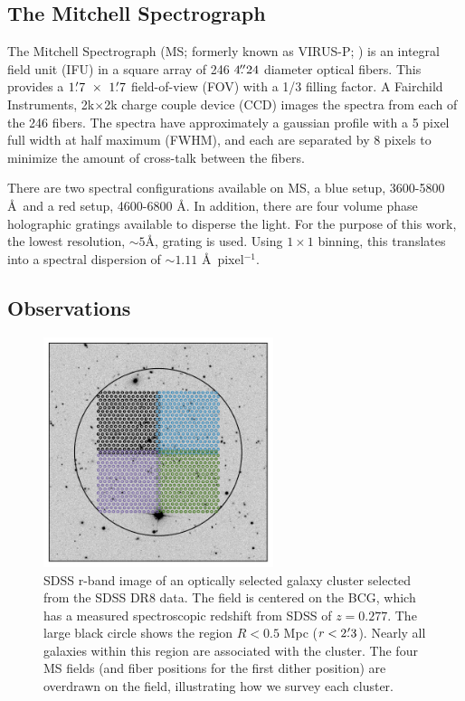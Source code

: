 \subsection{The Mitchell Spectrograph} 
The Mitchell Spectrograph (MS; formerly known as VIRUS-P; \citealt{Hill2008a}) is an integral field unit (IFU) in a square array of 246 $4\mbox{\ensuremath{.\!\!^{\prime\prime}}}24$ diameter optical fibers. This provides a $1\mbox{\ensuremath{.\mkern-4mu^\prime}}7~\times~1\mbox{\ensuremath{.\mkern-4mu^\prime}}7$ field-of-view (FOV) with a 1/3 filling factor. A Fairchild Instruments, 2k$\times$2k charge couple device (CCD) images the spectra from each of the 246 fibers. The spectra have approximately a gaussian profile with a 5 pixel full width at half maximum (FWHM), and each are separated by 8 pixels to minimize the amount of cross-talk between the fibers. 

There are two spectral configurations available on MS, a blue setup, 3600-5800 \AA\ and a red setup, 4600-6800 \AA. In addition, there are four volume phase holographic gratings available to disperse the light. For the purpose of this work, the lowest resolution, $\sim5$\AA, grating is used. Using $1\times1$ binning, this translates into a spectral dispersion of $\sim1.11$ \AA\ pixel$^{-1}$. 

\subsection{Observations} 
\begin{figure}[t]
	\includegraphics[width=0.6\textwidth]{./figures2/pointing.pdf} 
	\caption{SDSS r-band image of an optically selected galaxy cluster selected from the SDSS DR8 data. The field is centered on the BCG, which has a measured spectroscopic redshift from SDSS of $z = 0.277$. The large black circle shows the region $R<0.5$ Mpc ($r<2\mbox{\ensuremath{.\mkern-4mu^\prime}}3$). Nearly all galaxies within this region are associated with the cluster. The four MS fields (and fiber positions for the first dither position) are overdrawn on the field, illustrating how we survey each cluster.} \label{2fig:tiles} 
\end{figure}

